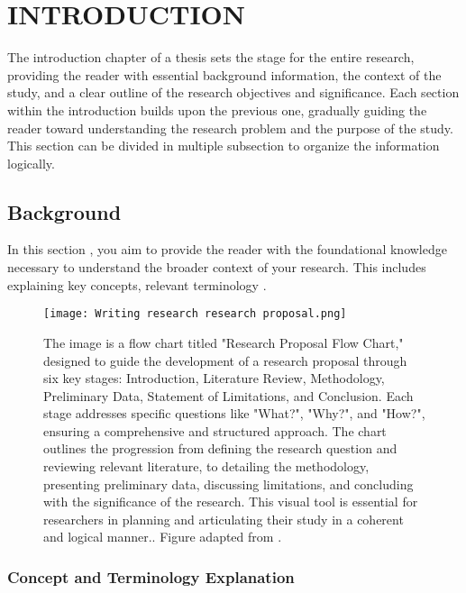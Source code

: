\chapter{INTRODUCTION}



The introduction chapter of a thesis sets the stage for the entire research, providing the reader with essential background information, the context of the study, and a clear outline of the research objectives and significance. Each section within the introduction builds upon the previous one, gradually guiding the reader toward understanding the research problem and the purpose of the study. This section can be divided in multiple subsection to organize the information logically.

\section{Background}

In this section \parencite{Lal_2005as, Vassalli2009}, you aim to provide the reader with the foundational knowledge necessary to understand the broader context of your research. This includes explaining key concepts, relevant terminology  \parencite{Amso_2015}.


\begin{figure}
	\centering
	\texttt{[image: Writing research research proposal.png]}
	\caption[Research Proposal Flow Chart]
	{The image is a flow chart titled "Research Proposal Flow Chart," designed to guide the development of a research proposal through six key stages: Introduction, Literature Review, Methodology, Preliminary Data, Statement of Limitations, and Conclusion. Each stage addresses specific questions like "What?", "Why?", and "How?", ensuring a comprehensive and structured approach. The chart outlines the progression from defining the research question and reviewing relevant literature, to detailing the methodology, presenting preliminary data, discussing limitations, and concluding with the significance of the research. This visual tool is essential for researchers in planning and articulating their study in a coherent and logical manner.. Figure adapted from \cite{Dorsett2010}.}
	\label{fig:ExxonSpreading}
\end{figure}
%


\subsection{Concept and Terminology Explanation}

